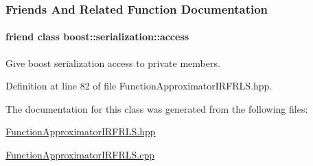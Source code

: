 \subsubsection{Friends And Related Function Documentation}
\hypertarget{classDmpBbo_1_1FunctionApproximatorIRFRLS_ac98d07dd8f7b70e16ccb9a01abf56b9c}{
\paragraph[{boost\+::serialization\+::access}]{\setlength{\rightskip}{0pt plus 5cm}friend class boost\+::serialization\+::access\hspace{0.3cm}{\ttfamily [friend]}}}\label{classDmpBbo_1_1FunctionApproximatorIRFRLS_ac98d07dd8f7b70e16ccb9a01abf56b9c}


Give boost serialization access to private members. 



Definition at line 82 of file Function\+Approximator\+I\+R\+F\+R\+L\+S.\+hpp.



The documentation for this class was generated from the following files\+:\begin{DoxyCompactItemize}
\item 
\hyperlink{FunctionApproximatorIRFRLS_8hpp}{Function\+Approximator\+I\+R\+F\+R\+L\+S.\+hpp}\item 
\hyperlink{FunctionApproximatorIRFRLS_8cpp}{Function\+Approximator\+I\+R\+F\+R\+L\+S.\+cpp}\end{DoxyCompactItemize}

